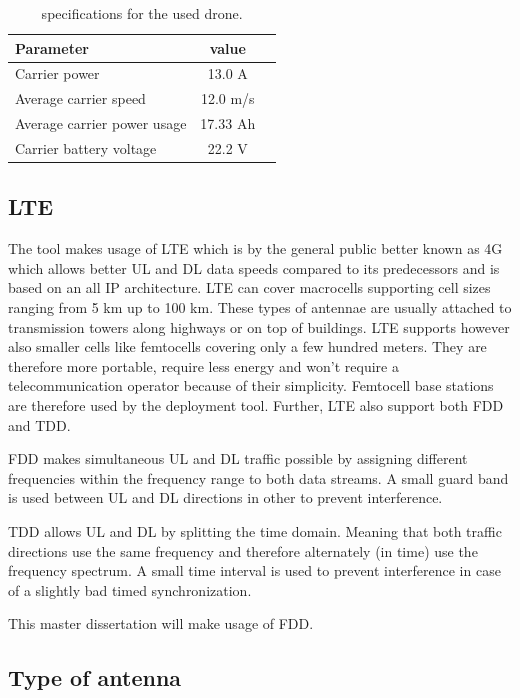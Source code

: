 \begin{table}[h!]
\centering
\begin{tabular}{|l|c|l|}
\hline
 Parameter          & value         \\    \hline
 Carrier power      & 13.0 A \\
 Average carrier speed           & 12.0 m/s       \\ 
 Average carrier power usage    & 17.33 Ah      \\ 
 Carrier battery voltage        & 22.2 V \\ \hline
\end{tabular}
\caption{specifications for the used drone.}
\label{table:dronespecs}
\end{table}

\subsection{LTE}
The tool makes usage of \gls{LTE} which is by the general public better known as 4G which allows better \gls{UL} and \gls{DL} data speeds 
compared to its predecessors and is based on an all IP architecture. LTE can cover macrocells supporting cell sizes ranging from 5 km up to 100 km. 
These types of antennae are usually attached to transmission towers along highways or on top of buildings. LTE supports however also smaller cells like
femtocells covering only a few hundred meters. They are therefore more portable, require less energy and won't require a telecommunication operator because
of their simplicity. Femtocell base stations are therefore used by the deployment tool.
Further, \gls{LTE} also support both \gls{FDD} and \gls{TDD}.

\gls{FDD} makes simultaneous \gls{UL} and \gls{DL} traffic possible by assigning different frequencies within the frequency range 
to both data streams. A small guard band is used between \gls{UL} and \gls{DL} directions in other to prevent interference.

\gls{TDD} allows  \gls{UL} and \gls{DL} by splitting the time domain. Meaning that both traffic directions use the same frequency and therefore
alternately (in time) use the frequency spectrum. A small time interval is used to prevent interference in case of a slightly bad timed synchronization.

This master dissertation will make usage of \gls{FDD}.

\subsection{Type of antenna} %

